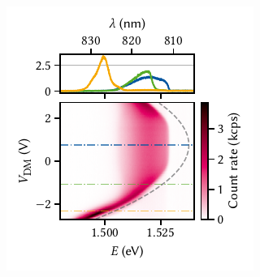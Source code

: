 \begin{marginfigure}
    \centering
    \includegraphics{img/pdf/experiment/doped_M1_05_49-2_difference_mode}
    \caption[
        ,
        .
        .
        \protect\newline
    ]{
        \Gls{pl} as function of difference-mode voltage on a large exciton trap.
        The observed Stark shift follows roughly the expected quadratic dispersion, but is offset by \qty{0.75}{\volt} with respect to zero bias.
        Dashed gray line is a guide to the eye of a parabola with curvature \qty{-3.5}{\milli\electronvolt\per\volt\squared}.
        Line cuts in the upper panel are taken at the voltages indicated by dash-dotted lines in the lower.
    }
    \label{fig:exp:pl:doped_M1_05_49-2_difference_mode}
\end{marginfigure}

